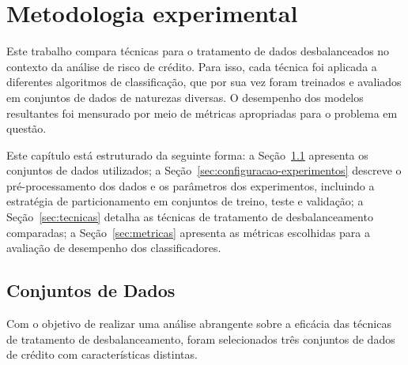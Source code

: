 \chapter{Metodologia experimental}\label{cap:ferramentas}

Este trabalho compara técnicas para o tratamento de dados desbalanceados no contexto da análise de risco de crédito. Para isso, cada técnica foi aplicada a diferentes algoritmos de classificação, que por sua vez foram treinados e avaliados em conjuntos de dados de naturezas diversas. O desempenho dos modelos resultantes foi mensurado por meio de métricas apropriadas para o problema em questão.

Este capítulo está estruturado da seguinte forma: a Seção~\ref{sec:datasets} apresenta os conjuntos de dados utilizados; a Seção~\ref{sec:configuracao-experimentos} descreve o pré-processamento dos dados e os parâmetros dos experimentos, incluindo a estratégia de particionamento em conjuntos de treino, teste e validação; a Seção~\ref{sec:tecnicas} detalha as técnicas de tratamento de desbalanceamento comparadas; a Seção~\ref{sec:metricas} apresenta as métricas escolhidas para a avaliação de desempenho dos classificadores.

\section{Conjuntos de Dados}\label{sec:datasets}

Com o objetivo de realizar uma análise abrangente sobre a eficácia das técnicas de tratamento de desbalanceamento, foram selecionados três conjuntos de dados de crédito com características distintas.

